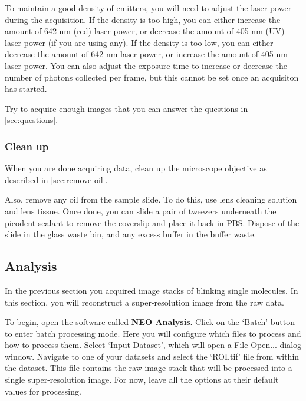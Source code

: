 \documentclass[10pt,a4paper,oneside]{book}
\begin{document}
To maintain a good density of emitters, you will need to adjust the laser power during the acquisition. If the density is too high, you can either increase the amount of 642 nm (red) laser power, or decrease the amount of 405 nm (UV) laser power (if you are using any). If the density is too low, you can either decrease the amount of 642 nm laser power, or increase the amount of 405 nm laser power. You can also adjust the exposure time to increase or decrease the number of photons collected per frame, but this cannot be set once an acquisiton has started.

Try to acquire enough images that you can answer the questions in \autoref{sec:questions}.

\subsubsection{Clean up}

\newline

When you are done acquiring data, clean up the microscope objective as described in \autoref{sec:remove-oil}.

Also, remove any oil from the sample slide. To do this, use lens cleaning solution and lens tissue. Once done, you can slide a pair of tweezers underneath the picodent sealant to remove the coverslip and place it back in PBS. Dispose of the slide in the glass waste bin, and any excess buffer in the buffer waste.

\subsection{Analysis}

In the previous section you acquired image stacks of blinking single molecules. In this section, you will reconstruct a super-resolution image from the raw data.

To begin, open the software called \textbf{NEO Analysis}. Click on the `Batch' button to enter batch processing mode. Here you will configure which files to process and how to process them. Select `Input Dataset', which will open a File Open... dialog window. Navigate to one of your datasets and select the `ROI.tif' file from within the dataset. This file contains the raw image stack that will be processed into a single super-resolution image. For now, leave all the options at their default values for processing.
\end{document}
